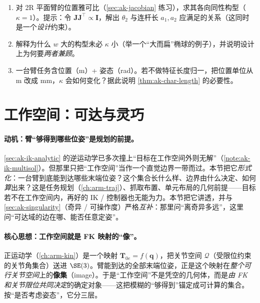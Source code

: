 \begin{practice}
\begin{enumerate}
  \item 对 2R 平面臂的位置雅可比（\cref{sec:ak-jacobian} 练习），求其各向同性构型（$\kappa=1$）。提示：令 $\mathbf{J}\mathbf{J}^\top\propto\mathbf{I}$，解出 $\theta_2$ 与连杆长 $a_1,a_2$ 应满足的关系（这同时是一个\emph{设计}约束）。
  \item 解释为什么 $w$ 大的构型未必 $\kappa$ 小（举一个“大而扁”椭球的例子），并说明设计上为何要\emph{两者兼顾}。
  \item 一台臂任务含位置（m）+ 姿态（rad）。若不做特征长度归一，把位置单位从 m 改成 mm，$\kappa$ 会如何变化？据此说明 \cref{thm:ak-char-length} 的必要性。
\end{enumerate}
\end{practice}

\section{工作空间：可达与灵巧}
\label{sec:ak-workspace}

\paragraph{动机：臂“够得到哪些位姿”是规划的前提。}
\cref{sec:ak-ik-analytic} 的逆运动学已多次撞上“目标在工作空间外则无解”（\cref{note:ak-ik-multisol}）。但那里只把“工作空间”当作一个直觉边界一带而过。本节把它\emph{形式化}：一台臂到底能到达哪些末端位姿？这个集合长什么样、边界由什么决定、如何\emph{算}出来？这是任务规划（\cref{ch:arm-traj}）、抓取布置、单元布局的几何前提——目标若不在工作空间内，再好的 IK / 控制器也无能为力。本节把它讲透，并与 \cref{sec:ak-singularity}（奇异 / 可操作度）严格\emph{互补}：那里问“离奇异多远”，这里问“可达域的边在哪、能否任意定姿”。

\paragraph{核心思想：工作空间就是 FK 映射的“像”。}
正运动学（\cref{ch:arm-kin}）是一个映射 $\mathbf{T}_{0e}=f(\mathbf{q})$，把关节空间 $\mathcal{Q}$（受限位约束的关节角集合）送进 $\SE(3)$。臂能到达的全部末端位姿，正是这个映射在\emph{整个可行关节空间}上的\textbf{像集}（image）。于是“工作空间”不是凭空的几何体，而是\emph{由 FK 和关节限位共同决定}的确定对象——这把模糊的“够得到”锚定成可计算的集合。按“是否考虑姿态”，它分三层。

